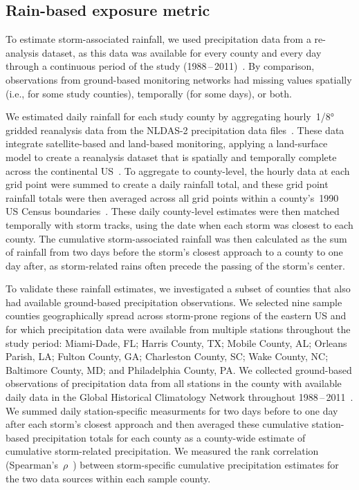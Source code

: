 \subsection*{Rain-based exposure metric}

To estimate storm-associated rainfall, we used precipitation data from a
re-analysis dataset, as this data was available for every county and every day
through a continuous period of the study
(1988\,--\,2011)~\parencite{alhamdan2014environmental, cdcwonder}.  By
comparison, observations from ground-based monitoring networks had missing
values spatially (i.e., for some study counties), temporally (for some days),
or both.  

We estimated daily rainfall for each study county by aggregating
hourly~1/8\si{\degree} gridded reanalysis data from the \ac{NLDAS-2}
precipitation data files~\parencite{rui2013nldas}. These data integrate
satellite-based and land-based monitoring, applying a land-surface model to
create a reanalysis dataset that is spatially and temporally complete across
the continental \ac{US}~\parencite{rui2013nldas, alhamdan2014environmental}. To
aggregate to county-level, the hourly data at each grid point were summed to
create a daily rainfall total, and these grid point rainfall totals were then
averaged across all grid points within a county's~1990 \ac{US} Census
boundaries~\parencite{alhamdan2014environmental, cdcwonder}. These daily
county-level estimates were then matched temporally with storm tracks, using
the date when each storm was closest to each county. The cumulative
storm-associated rainfall was then calculated as the sum of rainfall from two
days before the storm's closest approach to a county to one day after, as 
storm-related rains often precede the passing of the storm's center. 

To validate these rainfall estimates, we investigated a subset of counties that
also had available ground-based precipitation observations. We selected nine
sample counties geographically spread across storm-prone regions of the eastern
\ac{US} and for which precipitation data were available from multiple stations
throughout the study period: Miami-Dade, FL; Harris County, TX; Mobile County,
AL; Orleans Parish, LA; Fulton County, GA; Charleston County, SC; Wake County,
NC; Baltimore County, MD; and Philadelphia County, PA. We collected
ground-based observations of precipitation data from all stations in the county
with available daily data in the Global Historical Climatology Network
throughout 1988\,--\,2011~\parencite{menne2012overview, rnoaa, countyweather}.
We summed daily station-specific measurments for two days before to one day
after each storm's closest approach and then averaged these cumulative
station-based precipitation totals for each county as a county-wide estimate of
cumulative storm-related precipitation. We measured the rank correlation
(Spearman's~$\rho$~\parencite{spearman1904proof}) between storm-specific
cumulative precipitation estimates for the two data sources within each sample
county.

